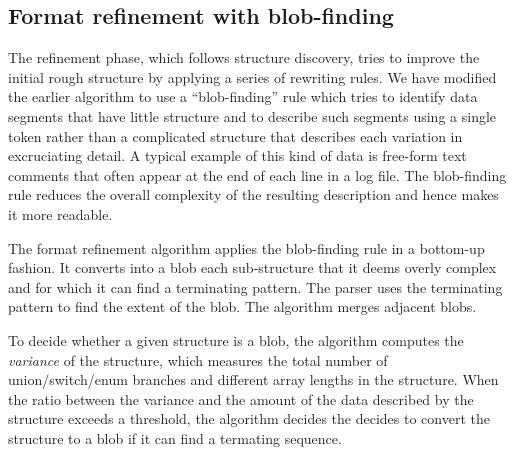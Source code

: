 \subsection{Format refinement with blob-finding}
The refinement phase, which follows structure discovery, tries to
improve the initial rough structure by applying a series of
rewriting rules.  We have modified the earlier algorithm to use a 
``blob-finding'' rule which tries to identify data segments that have
little structure and to describe such segments using a single
 token rather than a complicated structure that describes
each variation in excruciating detail.  A typical example of this kind
of data is free-form text comments that often appear at the end of
each line in a log file.  The blob-finding rule reduces the overall
complexity of the resulting description and hence makes it more
readable.

The format refinement algorithm applies the blob-finding rule 
in a bottom-up fashion. It converts into a blob each sub-structure
that it deems overly complex and for which it can find a terminating pattern. 
The \pads{} parser uses the terminating pattern to
find the extent of the blob. The algorithm merges adjacent blobs.

To decide whether a given structure is a blob, 
the algorithm computes the {\em variance} of the structure, which
measures the total number of union/switch/enum
branches and different array lengths in the 
structure. When the ratio between the variance and the amount of the data
described by the structure exceeds a threshold, the algorithm decides
the decides to convert the structure to a blob if it can find a
termating sequence.
